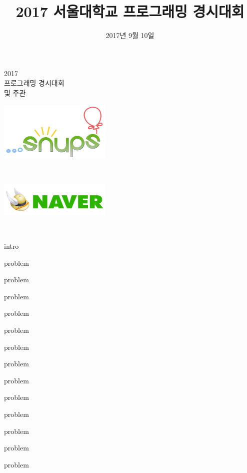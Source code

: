 \documentclass[11pt,a4paper,oneside,final]{article}
\title{2017 서울대학교 프로그래밍 경시대회}
\date{2017년 9월 10일}
\begin{document}
\begin{titlepage}
\begin{center}

\vspace*{3cm}

\textsc{\Huge2017}\\[0.5cm]
\textsc{ 프로그래밍 경시대회}\\[2cm]

\vspace{2cm}
\textsc{ 및 주관}\\[0.0cm]

\begin{center}
\includegraphics[width=0.4\textwidth]{snups.png}
\end{center}

\vspace{1cm}
\textsc{}\\[0.0cm]

\begin{center}
\includegraphics[width=0.4\textwidth]{naver.jpg}
\end{center}

\vspace{1cm}
\textsc{\Large \THEDATE}\\[0.5cm]

\vspace*{\fill}

\end{center}
\end{titlepage}

{intro}

{problem}

{problem}

{problem}

{problem}

{problem}

{problem}

{problem}

{problem}

{problem}

{problem}

{problem}

{problem}

{problem}
\end{document}
